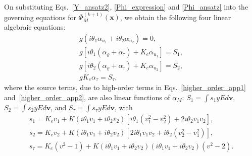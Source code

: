 

On substituting Eqs.~\eqref{Y_ansatz2}, \eqref{Phi_expression} and  \eqref{Phi_ansatz} into the governing equations for $\Phi^{(k+1)}_M(\bm{x})$, we obtain the following four linear algebraic equations:
\begin{eqnarray}
{g}(i\theta_1\alpha_{u_1}+i\theta_2\alpha_{u_2})=0, \label{GSIS_first}\\
{g}[i\theta_1(\alpha_\varrho+\alpha_\tau)+K_e\alpha_{u_1}]=S_1,\\
{g}[i\theta_2(\alpha_\varrho+\alpha_\tau)+K_e\alpha_{u_2}]=S_2,\\
{g}{K_e}\alpha_{\tau}=S_\tau, \label{GSIS_middle1}
\end{eqnarray}
where the source terms, due to high-order terms in Eqs.~\eqref{higher_order_app1} and~\eqref{higher_order_app2}, are also linear functions of $\alpha_M$: $S_1=\int{s_1}yEd\bm{v}$, $S_2=\int{s_2}yEd\bm{v}$, and $S_\tau=\int{s_\tau}yEd\bm{v}$, with
\begin{eqnarray}
s_1=K_ev_1+K(i\theta_1v_1+i\theta_2v_2)\left[i\theta_1(v_1^2-v_2^2)+2i\theta_2v_1v_2\right], \label{GSIS_middle2}\\
s_2=K_ev_2+K(i\theta_1v_1+i\theta_2v_2)\left[2i\theta_1v_1v_2+i\theta_2(v_2^2-v_1^2)\right], \\
s_\tau=K_e(v^2-1)+K(i\theta_1v_1+i\theta_2v_2)\left(i\theta_1v_1+i\theta_2v_2\right)(v^2-2). \label{GSIS_end}
\end{eqnarray} 



